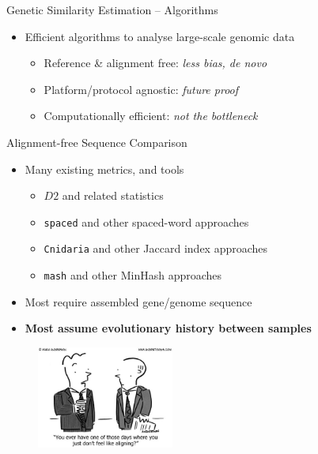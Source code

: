 \documentclass[t]{beamer}
\begin{document}
\begin{frame}[c]{Genetic Similarity Estimation -- Algorithms}
  \begin{itemize}
    \item Efficient algorithms to analyse large-scale genomic data
    \begin{itemize}
      \item Reference \& alignment free: \textit{less bias, de novo}
      \item Platform/protocol agnostic: \textit{future proof}
      \item Computationally efficient: \textit{not the bottleneck}
    \end{itemize}
  \end{itemize}
\end{frame}

\begin{frame}{Alignment-free Sequence Comparison}
  \begin{itemize}
    \item Many existing metrics, and tools
    \begin{itemize}
      \item $D2$ and related statistics
      \item \texttt{spaced} and other spaced-word approaches
        \autocite{morgenstern_estimating_2015,leimeister_fast_2014}
      \item \texttt{Cnidaria} and other Jaccard index approaches
        \autocite{aflitos_cnidaria:_2015}
      \item \texttt{mash} and other MinHash approaches
        \autocite{ondov_fast_2015}
    \end{itemize}
    \item Most require assembled gene/genome sequence
    \item \textbf{Most assume evolutionary history between samples}
  \end{itemize}
  \begin{figure}
    \centering
    \includegraphics[width=0.4\textwidth]{img/aln.jpg}
  \end{figure}
\end{frame}
\end{document}
